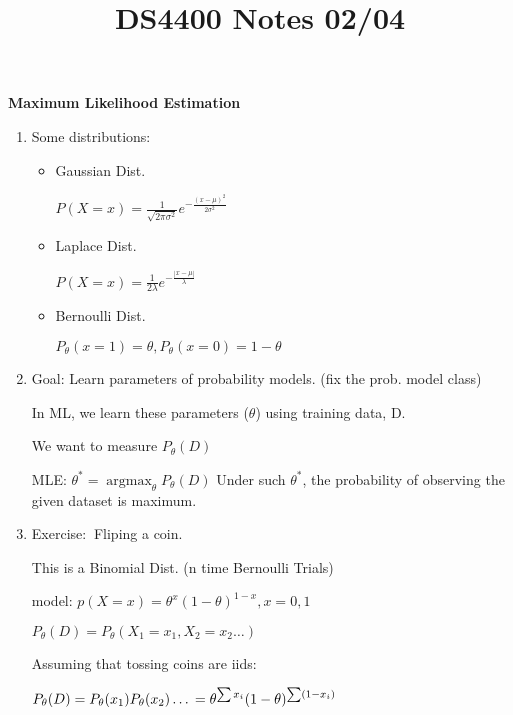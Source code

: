 \documentclass[12pt]{article}
\newcommand{\exe}{{\color{green} Exercise: $\ $}}
\DeclareMathOperator*{\argmax}{\arg\max}
\begin{document}
\begin{multicols}{2}
        \title{DS4400 Notes 02/04}
        \maketitle

        \textbf{Maximum Likelihood Estimation}
        \begin{enumerate}            
            \item Some distributions:
            \begin{itemize}
                \item Gaussian Dist.
                
                $P(X=x) = \frac{1}{\sqrt{2\pi \sigma^2}}e^{-\frac{(x-\mu)^2}{2\sigma^2}}$
                \item Laplace Dist.
                
                $P(X = x) = \frac{1}{2\lambda}e^{-\frac{|x-\mu|}{\lambda}}$

                \item Bernoulli Dist.
                
                $P_\theta(x = 1) = \theta, P_\theta(x = 0) = 1 -\theta$
            \end{itemize}

            \item Goal: Learn parameters of probability models. (fix the prob. model class)
            
            In ML, we learn these parameters ($\theta$) using training data, D.

            We want to measure $P_\theta(D)$

            MLE: $\theta^* = \argmax_{\theta}P_\theta(D)$ Under such $\theta^*$, the probability of observing the given dataset is maximum.

            \item \exe Fliping a coin.
            
            This is a Binomial Dist. (n time Bernoulli Trials)
            
            model: $p(X = x) = \theta^{x}(1-\theta)^{1-x}, x = 0, 1$

            $P_\theta(D) = P_\theta(X_1 = x_1, X_2 = x_2 \dots)$

            Assuming that tossing coins are iids:

            $P_\theta(D) = P_\theta(x_1)P_\theta(x_2) \dots\\
            = \theta^{\sum x_i} (1-\theta)^{\sum (1-x_i)}$


\end{enumerate}
\end{multicols}
\end{document}
